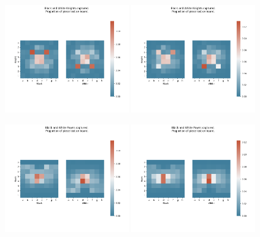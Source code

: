 \documentclass[11pt]{article}
\begin{document}
\begin{center}
\includegraphics[width=0.4\textwidth]{Images/_HEATMAP_Knight_FISC.png}
\includegraphics[width=0.4\textwidth]{Images/_HEATMAP_Knight_TOURNEMENTS.png}
\end{center}
\begin{center}
\includegraphics[width=0.4\textwidth]{Images/_HEATMAP_Pawn_FISC.png}
\includegraphics[width=0.4\textwidth]{Images/_HEATMAP_Pawn_TOURNEMENTS.png}
\end{center}
\end{document}
